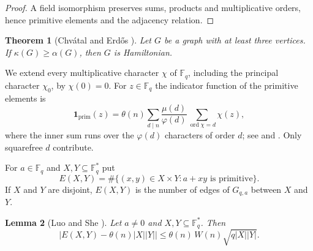 \documentclass{amsart}
\newtheorem{theorem}{Theorem}[section]
\newtheorem{lemma}[theorem]{Lemma}
\theoremstyle{remark}
\numberwithin{equation}{section}
\numberwithin{table}{section}
\newcommand{\F}{\mathbb{F}}
\newcommand{\abs}[1]{\lvert #1\rvert}
\newcommand{\bigabs}[1]{\bigl\lvert #1\bigr\rvert}
\newcommand{\prim}{\mathbf{1}_{\mathrm{prim}}}
\DeclareMathOperator{\ord}{ord}
\begin{document}
\begin{proof}
A field isomorphism preserves sums, products and multiplicative orders, hence primitive elements and the adjacency relation.
\end{proof}

\begin{theorem}[Chv\'atal and Erd\H{o}s {\cite[Theorem~1]{CE}}]\label{thm:CE}
Let $G$ be a graph with at least three vertices. If $\kappa(G)\ge\alpha(G)$, then $G$ is Hamiltonian.
\end{theorem}

We extend every multiplicative character $\chi$ of $\F_q$, including the principal character $\chi_0$, by $\chi(0)=0$. For $z\in\F_q$ the indicator function of the primitive elements is
\begin{equation}\label{eq:indicator}
\prim(z)=\theta(n)\sum_{d\mid n}\frac{\mu(d)}{\varphi(d)}\sum_{\ord\chi=d}\chi(z),
\end{equation}
where the inner sum runs over the $\varphi(d)$ characters of order $d$; see \cite[(1)]{LS} and \cite[Section~2]{COT}. Only squarefree $d$ contribute.

For $a\in\F_q$ and $X,Y\subseteq\F_q^{*}$ put
\[
E(X,Y)=\#\{(x,y)\in X\times Y : a+xy \text{ is primitive}\}.
\]
If $X$ and $Y$ are disjoint, $E(X,Y)$ is the number of edges of $G_{q,a}$ between $X$ and $Y$.

\begin{lemma}[Luo and She {\cite[Lemma~2.2]{LS}}]\label{lem:edges}
Let $a\neq0$ and $X,Y\subseteq\F_q^{*}$. Then
\[
\bigabs{E(X,Y)-\theta(n)\abs X\abs Y}\le \theta(n)\,W(n)\sqrt{q\abs X\abs Y}.
\]
\end{lemma}
\end{document}
